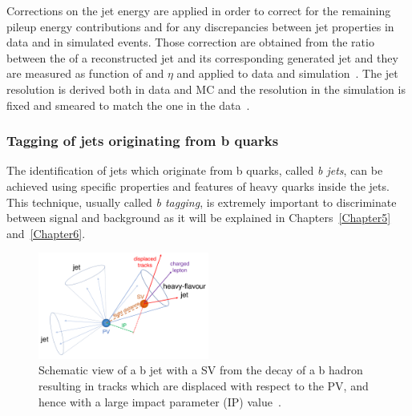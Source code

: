 Corrections on the jet energy are applied in order to correct for the
remaining pileup energy contributions and for any discrepancies
between jet properties in data and in simulated events. Those
correction are obtained from the ratio between the \pt of a
reconstructed jet and its corresponding generated jet and they are
measured as function of \pt and $\eta$ and applied to data and
simulation~\cite{Khachatryan_2017_jet}. The jet \pt resolution is
derived both in data and MC and the resolution in the simulation is
fixed and smeared to match the one in the
data~\cite{Khachatryan_2017_jet}.

\subsubsection{Tagging of jets originating from b
  quarks}\label{sec:tagging}
The identification of jets which originate from b quarks, called
\emph{b jets}, can be achieved using
specific properties and features of heavy
quarks inside the jets. This technique, usually called \emph{b tagging}, is
extremely important to discriminate between signal and background as
it will be explained in Chapters~\ref{Chapter5}
and~\ref{Chapter6}.

\begin{figure}[h]
\centering
    \includegraphics[clip,trim=0.3cm 0.5cm 0.3cm 0.3cm, width=0.50\textwidth]{Figures/c2/tagging}
  \caption{Schematic view of a b jet with a SV from the decay of a b hadron resulting in tracks which are displaced with respect to the PV, and hence with a large impact parameter (IP) value~\cite{Sirunyan_2018_tagging}.}
\label{fig:btagging}
\end{figure}

